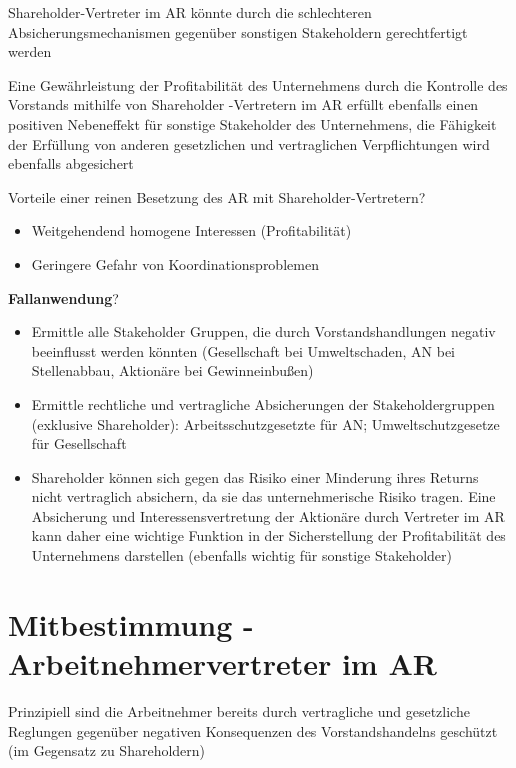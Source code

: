 \documentclass[
]{article}
\providecommand{\tightlist}{%
  \setlength{\itemsep}{0pt}\setlength{\parskip}{0pt}}
\begin{document}
Shareholder-Vertreter im AR könnte durch die schlechteren
Absicherungsmechanismen gegenüber sonstigen Stakeholdern gerechtfertigt
werden

Eine Gewährleistung der Profitabilität des Unternehmens durch die
Kontrolle des Vorstands mithilfe von Shareholder -Vertretern im AR
erfüllt ebenfalls einen positiven Nebeneffekt für sonstige Stakeholder
des Unternehmens, die Fähigkeit der Erfüllung von anderen gesetzlichen
und vertraglichen Verpflichtungen wird ebenfalls abgesichert

Vorteile einer reinen Besetzung des AR mit Shareholder-Vertretern?

\begin{itemize}
\tightlist
\item
  Weitgehendend homogene Interessen (Profitabilität)
\item
  Geringere Gefahr von Koordinationsproblemen
\end{itemize}

\textbf{Fallanwendung}?

\begin{itemize}
\tightlist
\item
  Ermittle alle Stakeholder Gruppen, die durch Vorstandshandlungen
  negativ beeinflusst werden könnten (Gesellschaft bei Umweltschaden, AN
  bei Stellenabbau, Aktionäre bei Gewinneinbußen)
\item
  Ermittle rechtliche und vertragliche Absicherungen der
  Stakeholdergruppen (exklusive Shareholder): Arbeitsschutzgesetzte für
  AN; Umweltschutzgesetze für Gesellschaft
\item
  Shareholder können sich gegen das Risiko einer Minderung ihres Returns
  nicht vertraglich absichern, da sie das unternehmerische Risiko
  tragen. Eine Absicherung und Interessensvertretung der Aktionäre durch
  Vertreter im AR kann daher eine wichtige Funktion in der
  Sicherstellung der Profitabilität des Unternehmens darstellen
  (ebenfalls wichtig für sonstige Stakeholder)
\end{itemize}

\hypertarget{mitbestimmung--arbeitnehmervertreter-im-ar}{%
\section{Mitbestimmung -Arbeitnehmervertreter im
AR}\label{mitbestimmung--arbeitnehmervertreter-im-ar}}

Prinzipiell sind die Arbeitnehmer bereits durch vertragliche und
gesetzliche Reglungen gegenüber negativen Konsequenzen des
Vorstandshandelns geschützt (im Gegensatz zu Shareholdern)
\end{document}
